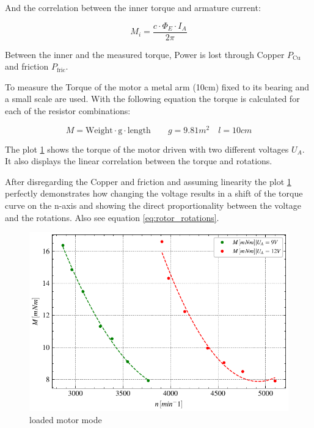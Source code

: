 \documentclass[conference]{IEEEtran}
\begin{document}
And the correlation between the inner torque and armature current:

\begin{equation} \label{eq:inner_tourque}
    M_i = \frac{c \cdot \Phi_E \cdot I_A}{2 \pi}
\end{equation}


Between the inner and the measured torque, Power is lost through Copper
$P_\mathrm{Cu}$ and friction $ P_\text{fric}$.

To measure the Torque of the motor a metal arm (10cm) fixed to its bearing and
a small scale are used. With the following equation the torque is calculated
for each of the resistor combinations:

\begin{equation}
    M = \text{Weight} \cdot \mathrm{g} \cdot \text{length} \qquad g=9.81
    \si{m}^2 \quad l=10 \si{cm}
    \label{eq:tourqe_weight_length}
\end{equation}






The plot \ref{fig:loaded_motor_mode} shows the torque of the motor driven with
two different voltages $U_A$. It also displays the linear correlation between the
torque and rotations.

After disregarding the Copper and friction and assuming linearity the plot
\ref{fig:loaded_motor_mode} perfectly demonstrates how changing the voltage
results in a shift of the torque curve on the n-axis and showing the direct
proportionality between the voltage and the rotations. Also see equation
\ref{eq:rotor_rotations}.

\begin{figure}[htbp]
    \centering
    \includegraphics[width=\columnwidth]{plots/4.3_Belasteter_Motor_UA9V_12V.pdf}
    \caption{loaded motor mode}
    \label{fig:loaded_motor_mode}
\end{figure}
\end{document}
